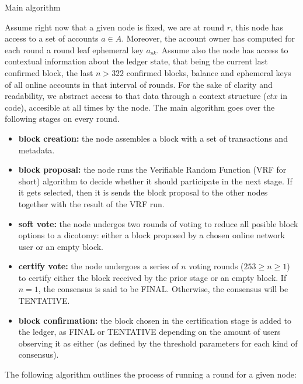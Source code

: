 \documentclass[10pt,a4paper]{article}
\begin{document}
\begin{section}{Main algorithm}

Assume right now that a given node is fixed, we are at round $r$,
this node has access to a set of accounts $a\in A$. 
Moreover, the account owner has computed for each round a round 
leaf ephemeral key $a_{sk}$. Assume also the node has access to contextual
information about the ledger state, that being the current last confirmed block,
the last $n > 322$ confirmed blocks, balance and ephemeral keys of all 
online accounts in that interval of rounds. For the sake of clarity and readability, 
we abstract access to that data through a context structure ($ctx$ in code), accesible
at all times by the node.
The main algorithm goes over the following stages on every round.
\begin{itemize}
    \item {\bf block creation:} the node assembles a block with a set of
        transactions and metadata.
    \item {\bf block proposal:} the node runs the Verifiable Random Function 
        (VRF for short) algorithm to decide whether it should participate in 
        the next stage. If it gets selected, then it is sends the block proposal 
        to the other nodes together with the result of the VRF run.
    \item {\bf soft vote:} the node undergos two rounds of voting to 
        reduce all posible block options to a dicotomy: either a block 
        proposed by a chosen online network user or an empty block.
    \item {\bf certify vote:} the node undergoes a series of $n$ voting rounds
        ($253 \geq n \geq 1$) to certify either the block received by the 
        prior stage or an empty block. If $n = 1$, the consensus is said 
        to be FINAL. Otherwise, the consensus will be TENTATIVE.
    \item {\bf block confirmation:} the block chosen in the certification 
        stage is added to the ledger, as FINAL or TENTATIVE depending on 
        the amount of users observing it as either (as defined by the 
        threshold parameters for each kind of consensus).
\end{itemize} 

The following algorithm outlines the process of running a round for a given node:


\end{section}
\end{document}
